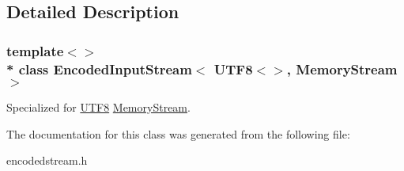 \subsection{Detailed Description}
\subsubsection*{template$<$$>$\\*
class Encoded\+Input\+Stream$<$ U\+T\+F8$<$$>$, Memory\+Stream $>$}

Specialized for \hyperlink{a00333}{U\+T\+F8} \hyperlink{a00224}{Memory\+Stream}. 

The documentation for this class was generated from the following file\+:\begin{DoxyCompactItemize}
\item 
encodedstream.\+h\end{DoxyCompactItemize}
